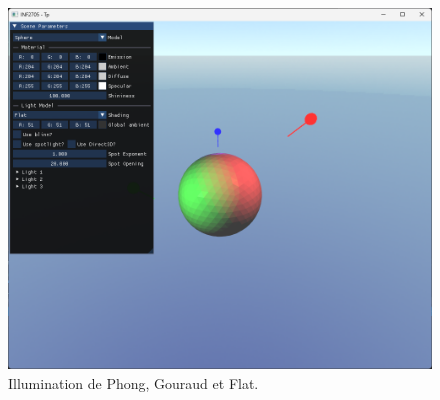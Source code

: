 \documentclass{article}[letterpaper, 11pt]
\begin{document}
\begin{figure}[h]
\begin{minipage}[c]{.33\linewidth}
		\centering
		\includegraphics[scale = 0.15]{image_6.png}
  \end{minipage}
		 \caption{ \centering Illumination de Phong, Gouraud et Flat.}
\end{figure}
\end{document}
